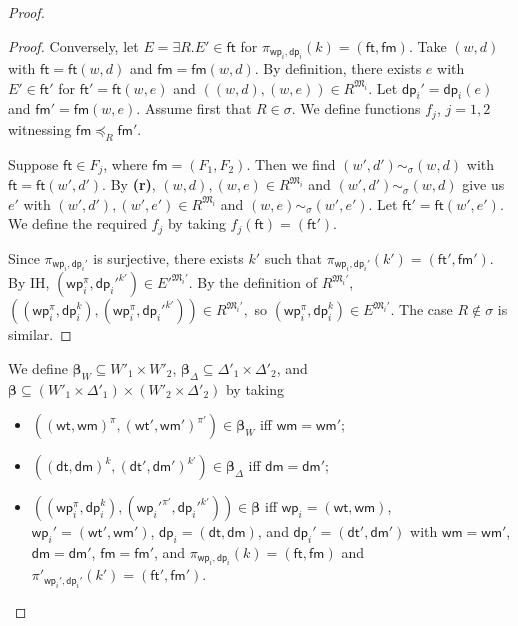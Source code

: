\documentclass[10pt,a4paper]{amsart}
\theoremstyle{plain}
\theoremstyle{definition}
\newcommand{\wt}{\mathsf{wt}}
\newcommand{\dt}{\mathsf{dt}}
\newcommand{\ft}{\mathsf{ft}}
\newcommand{\wm}{\mathsf{wm}}
\newcommand{\dm}{\mathsf{dm}}
\newcommand{\iwp}{\mathsf{wp}_i}
\newcommand{\idp}{\mathsf{dp}_i}
\newcommand{\pet}{\ft}
\newcommand{\pam}{\mathsf{fm}}
\newcommand{\et}{\ft}
\newcommand{\bs}{\boldsymbol{\beta}}
\begin{document}
\begin{proof}
\begin{proof}
Conversely, let $E=\exists R.E' \in \pet$ for $\pi_{\iwp,\idp}(k)=
(\pet,\pam)$. Take $(w,d)$ with $\pet=\pet(w,d)$ and $\pam=\pam(w,d)$. By definition, there exists $e$ with $E'\in \pet'$ for
$\pet'=\pet(w,e)$ and $((w,d),(w,e))\in R^{\mathfrak{M}_{i}}$. Let $\idp'=\idp(e)$ and $\pam'=\pam(w,e)$. 
%
Assume first that $R\in \sigma$.
We define functions $f_{j}$, $j=1,2$ witnessing $\pam \preceq_{R} \pam'$. 

Suppose $\et \in F_{j}$, where $\pam=(F_{1},F_{2})$.  
Then we find $(w',d')\sim_{\sigma} (w,d)$ with  
$\et = \pet(w',d')$. 
%
By {\bf (r)}, $(w,d),(w,e) \in R^{\mathfrak{M}_{i}}$ and $(w',d')\sim_{\sigma} (w,d)$ give us $e'$ with $(w',d'),(w',e') \in R^{\mathfrak{M}_{i}}$ and $(w,e)\sim_{\sigma} (w',e')$. Let $\et'= \pet(w',e')$. We define the required $f_{j}$ by taking $f_{j}(\et)=(\et')$.
%

Since $\pi_{\iwp,\idp'}$ is surjective, there exists 
$k'$ such that $\pi_{\iwp,\idp'}(k')=(\pet',\pam')$.
By IH, $(\iwp^\pi,\idp'^{k'}) \in E'^{\mathfrak{M}_{i}'}$. By the definition of $R^{\mathfrak{M}_{i}'}$,
%
$
((\iwp^\pi,\idp^k),(\iwp^\pi,\idp'^{k'})) \in R^{\mathfrak{M}_{i}'},
$
%
so $(\iwp^\pi,\idp^k)\in E^{\mathfrak{M}_{i}'}$.
%
The case $R\not\in\sigma$ is similar. 
\end{proof}

We define $\bs_W \subseteq W'_1 \times W'_2$, $\bs_\Delta \subseteq \Delta'_1 \times \Delta'_2$, and $\bs \subseteq (W'_{1}\times \Delta'_{1}) \times (W'_{2} \times \Delta'_{2})$ by taking  
%
\begin{itemize}
\item[--] $((\wt,\wm)^{\pi},(\wt',\wm')^{\pi'})\in \bs_{W}$ iff $\wm=\wm'$;

\item[--] $((\dt,\dm)^{k},(\dt',\dm')^{k'}) \in \bs_{\Delta}$ iff $\dm=\dm'$;

\item[--] $((\iwp^{\pi}, \idp^{k}),({\iwp'}^{\pi'},{\idp'}^{k'}))\in \bs$ iff $\iwp= (\wt,\wm)$, $\iwp'=(\wt',\wm')$, $\idp=(\dt,\dm)$, and $\idp'=(\dt',\dm')$ with $\wm=\wm'$, $\dm=\dm'$, $\pam=\pam'$, and $\pi_{\iwp,\idp}(k) = (\pet,\pam)$ and $\pi'_{\iwp',\idp'}(k') = (\pet',\pam')$. 
\end{itemize}
%	


\end{proof}
\end{document}
